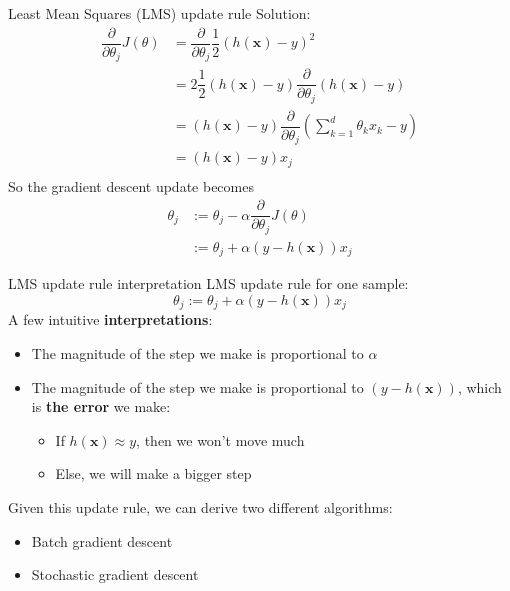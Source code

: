 \documentclass{beamer}
\newcommand{\bx}{\bm{x}}
\newcommand{\1}[1]{\mathbbm{1}\left[#1\right]}
\begin{document}
\begin{frame}{Least Mean Squares (LMS) update rule}
Solution: 
\begin{equation*}
\begin{split}
\dfrac{\partial}{\partial \theta_j} J(\theta) & = \dfrac{\partial}{\partial \theta_j} \dfrac{1}{2} \left( h\left(\bx\right) - y \right)^2 \\ 
 & = 2 \dfrac{1}{2} \left( h\left(\bx\right) - y \right) \dfrac{\partial}{\partial \theta_j}\left( h\left(\bx\right) - y \right)\\
 & = \left( h\left(\bx\right) - y \right) \dfrac{\partial}{\partial \theta_j}\left( \sum_{k = 1}^{d} \theta_k x_k - y \right)\\
 & = \left( h\left(\bx\right) - y \right) x_j\\
\end{split}
\end{equation*}
\pause
\vfill
So the gradient descent update becomes
\begin{equation*}
\begin{split}
\theta_j &:= \theta_j - \alpha \dfrac{\partial}{\partial \theta_j} J(\theta) \\
 & := \theta_j + \alpha \left( y - h\left(\bx\right)\right) x_j
\end{split}
\end{equation*}
\end{frame}

\begin{frame}{LMS update rule interpretation}
LMS update rule for one sample:
\begin{equation*}
 \theta_j := \theta_j + \alpha \left( y - h\left(\bx\right)\right) x_j
\end{equation*}
\vfill
\pause
A few intuitive \textbf{interpretations}:
\begin{itemize}
	\item The magnitude of the step we make is proportional to $\alpha$
	\item The magnitude of the step we make is proportional to $ \left( y - h\left(\bx\right)\right)$, which is \textbf{the error} we make:
	\begin{itemize}
		\item If $h\left(\bx\right) \approx y$, then we won't move much
		\item Else, we will make a bigger step
	\end{itemize}
\end{itemize}
\vfill
\pause
Given this update rule, we can derive two different algorithms:
\begin{itemize}
	\item Batch gradient descent
	\item Stochastic gradient descent
\end{itemize}
\end{frame}
\end{document}
